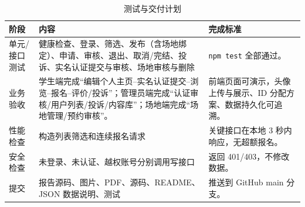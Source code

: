 \documentclass[a4paper]{article}
\begin{document}
\begin{table}[H]
  \centering
  \begin{tabularx}{\linewidth}{P{3.0cm} P{6.0cm} Y}
    \toprule
    阶段 & 内容 & 完成标准 \\
    \midrule
    单元/接口测试 & 健康检查、登录、筛选、发布（含场地绑定）、申请、审核、退出、取消/完结、投诉、实名认证提交与审核、场地审核与删除 & \texttt{npm test} 全部通过。 \\
    业务验收 & 学生端完成“编辑个人主页--实名认证提交--浏览--报名--评价/投诉”；管理员端完成“认证审核/用户列表/投诉/内容库”；场地端完成“场地管理/预约审核”。 & 前端页面可演示，头像上传与展示、ID 分配方案、数据持久化可追溯。 \\
    性能检查 & 构造列表筛选和连续报名请求 & 关键接口在本地 3 秒内响应，无超额报名。 \\
    安全检查 & 未登录、未认证、越权账号分别调用写接口 & 返回 401/403，不修改数据。 \\
    提交 & 报告源码、图片、PDF、源码、README、JSON 数据说明、测试 & 推送到 GitHub main 分支。 \\
    \bottomrule
  \end{tabularx}
  \caption{测试与交付计划}
\end{table}
\end{document}
